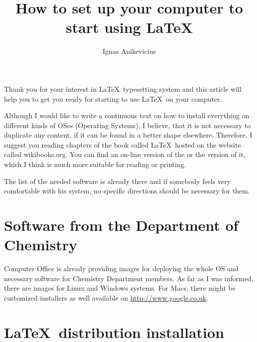 

\usepackage{perpage}
\lstset{language=bash,numbers=none}
\newcommand{\MiKTeX}{MiK\TeX}
\newcommand{\MacTeX}{Mac\TeX}

\title{How to set up your computer to start using \LaTeX{}}
\author{Ignas Anikevicius}



\maketitle

\tableofcontents

Thank you for your interest in \LaTeX\ typesetting system and this article
will help you to get you ready for starting to use \LaTeX\ on your
computer.

Although I would like to write a continuous text on how to install
everything on different kinds of OSes (Operating Systems), I believe, that it
is not necessary to duplicate any content, if it can be found in a better
shape elsewhere. Therefore, I suggest you reading chapters of the book called
\LaTeX\ hosted on the website called wikibooks.org. You can find an on-line
version of the
 or the
version of it, which I think is much more suitable for reading or printing.

The list of the needed software is already there and if somebody feels very
comfortable with his system, no specific directions should be necessary for
them.


\section{Software from the Department of Chemistry}

Computer Office is already providing images for deploying the whole OS and
necessary software for Chemistry Department members. As far as I was informed,
there are images for Linux and Windows systems. For Macs, there might be
customized installers as well available on \url{http://www.google.co.uk}.

\section{\LaTeX\ distribution installation}

